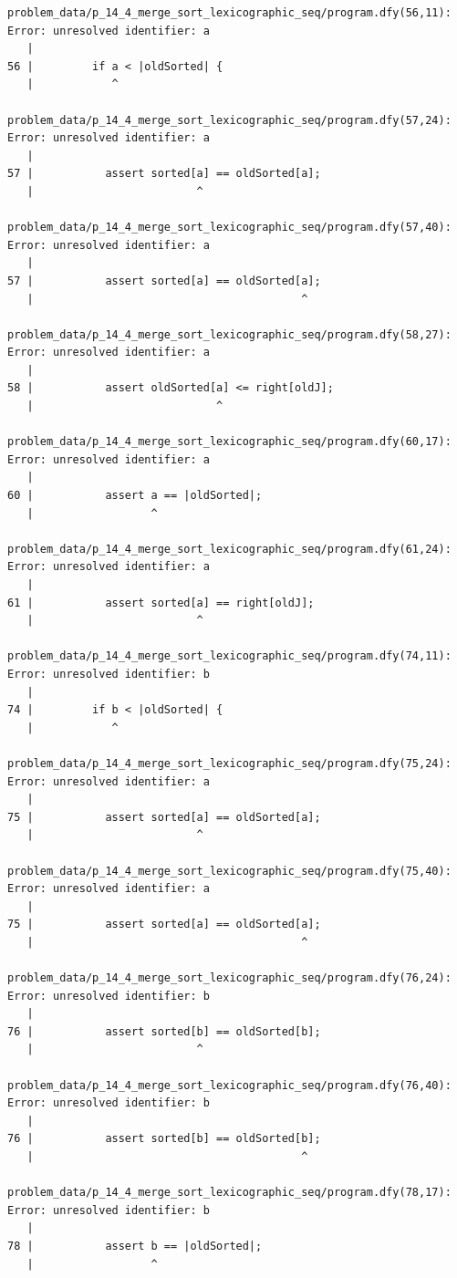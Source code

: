 \documentclass{article}
\begin{document}
\begin{lstlisting}
problem_data/p_14_4_merge_sort_lexicographic_seq/program.dfy(56,11): Error: unresolved identifier: a
   |
56 |         if a < |oldSorted| {
   |            ^

problem_data/p_14_4_merge_sort_lexicographic_seq/program.dfy(57,24): Error: unresolved identifier: a
   |
57 |           assert sorted[a] == oldSorted[a];
   |                         ^

problem_data/p_14_4_merge_sort_lexicographic_seq/program.dfy(57,40): Error: unresolved identifier: a
   |
57 |           assert sorted[a] == oldSorted[a];
   |                                         ^

problem_data/p_14_4_merge_sort_lexicographic_seq/program.dfy(58,27): Error: unresolved identifier: a
   |
58 |           assert oldSorted[a] <= right[oldJ];
   |                            ^

problem_data/p_14_4_merge_sort_lexicographic_seq/program.dfy(60,17): Error: unresolved identifier: a
   |
60 |           assert a == |oldSorted|;
   |                  ^

problem_data/p_14_4_merge_sort_lexicographic_seq/program.dfy(61,24): Error: unresolved identifier: a
   |
61 |           assert sorted[a] == right[oldJ];
   |                         ^

problem_data/p_14_4_merge_sort_lexicographic_seq/program.dfy(74,11): Error: unresolved identifier: b
   |
74 |         if b < |oldSorted| {
   |            ^

problem_data/p_14_4_merge_sort_lexicographic_seq/program.dfy(75,24): Error: unresolved identifier: a
   |
75 |           assert sorted[a] == oldSorted[a];
   |                         ^

problem_data/p_14_4_merge_sort_lexicographic_seq/program.dfy(75,40): Error: unresolved identifier: a
   |
75 |           assert sorted[a] == oldSorted[a];
   |                                         ^

problem_data/p_14_4_merge_sort_lexicographic_seq/program.dfy(76,24): Error: unresolved identifier: b
   |
76 |           assert sorted[b] == oldSorted[b];
   |                         ^

problem_data/p_14_4_merge_sort_lexicographic_seq/program.dfy(76,40): Error: unresolved identifier: b
   |
76 |           assert sorted[b] == oldSorted[b];
   |                                         ^

problem_data/p_14_4_merge_sort_lexicographic_seq/program.dfy(78,17): Error: unresolved identifier: b
   |
78 |           assert b == |oldSorted|;
   |                  ^


\end{lstlisting}
\end{document}
